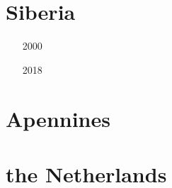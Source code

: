 \section{Siberia}

\begin{scriptsize}
\begin{itemize}
\item[2000] 
\item[2018] 
\end{itemize}
\end{scriptsize}


\section{Apennines}

\begin{scriptsize}
\begin{itemize}
\item[\nineteenninetyeight] 
\item[\twothousandseven] 
\item[\twothousandnine] 
\item[\twothousandfourteen] 
\item[\twothousandfifteen] 
\item[\twothousandtwenty] 
\end{itemize}
\end{scriptsize}

\section{the Netherlands}

\begin{scriptsize}
\begin{itemize}
\item[\twothousandtwo]  
\item[\twothousandtwenty]  
\end{itemize}
\end{scriptsize}

